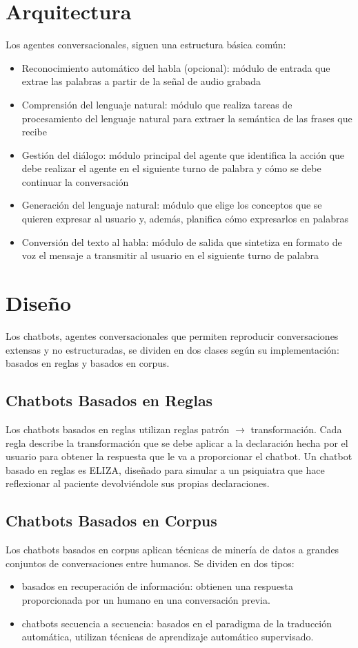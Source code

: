 \documentclass{report}
\begin{document}
\section{Arquitectura}
Los agentes conversacionales, siguen una estructura básica común:
\begin{itemize}
    \item Reconocimiento automático del habla (opcional): módulo de entrada que extrae las palabras a partir de la señal de audio grabada
    \item Comprensión del lenguaje natural: módulo que realiza tareas de procesamiento del lenguaje natural para extraer la semántica de las frases que recibe
    \item Gestión del diálogo: módulo principal del agente que identifica la acción que debe realizar el agente en el siguiente turno de palabra y cómo se debe continuar la conversación
    \item Generación del lenguaje natural: módulo que elige los conceptos que se quieren expresar al usuario y, además, planifica cómo expresarlos en palabras
    \item Conversión del texto al habla: módulo de salida que sintetiza en formato de voz el mensaje a transmitir al usuario en el siguiente turno de palabra
\end{itemize}

\section{Diseño}
Los chatbots, agentes conversacionales que permiten reproducir conversaciones extensas y no estructuradas, se dividen en dos clases según su implementación: basados en reglas y basados en corpus.

\subsection{Chatbots Basados en Reglas}
Los chatbots basados en reglas utilizan reglas patrón \(\rightarrow\) transformación. Cada regla describe la transformación que se debe aplicar a la declaración hecha por el usuario para obtener la respuesta que le va a proporcionar el chatbot. Un chatbot basado en reglas es ELIZA, diseñado para simular a un psiquiatra que hace reflexionar al paciente devolviéndole sus propias declaraciones.

\subsection{Chatbots Basados en Corpus}
Los chatbots basados en corpus aplican técnicas de minería de datos a grandes conjuntos de conversaciones entre humanos. Se dividen en dos tipos:
\begin{itemize}
    \item basados en recuperación de información: obtienen una respuesta proporcionada por un humano en una conversación previa.
    \item chatbots secuencia a secuencia: basados en el paradigma de la traducción automática, utilizan técnicas de aprendizaje automático supervisado.
\end{itemize}
\end{document}
